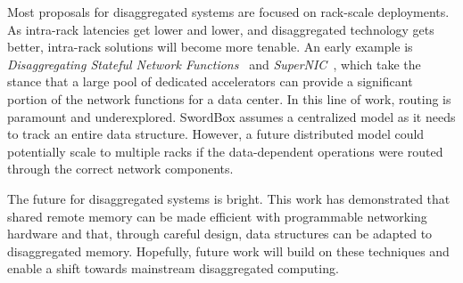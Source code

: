 \documentclass[12pt]{ucsddissertation}
\newcommand{\sword}{SwordBox}
\begin{document}
Most proposals for disaggregated systems are focused on rack-scale deployments. As intra-rack
latencies get lower and lower, and disaggregated technology gets better, intra-rack solutions will
become more tenable. An early example is \textit{Disaggregating Stateful Network
Functions}~\cite{dsnf} and \textit{SuperNIC}~\cite{supernic}, which take the stance that a large
pool of dedicated accelerators can provide a significant portion of the network functions for a data
center. In this line of work, routing is paramount and underexplored. {\sword} assumes a
centralized model as it needs to track an entire data structure. However, a future distributed model
could potentially scale to multiple racks if the data-dependent operations were routed through the
correct network components.

The future for disaggregated systems is bright. This work has demonstrated that shared remote memory
can be made efficient with programmable networking hardware and that, through careful design, data
structures can be adapted to disaggregated memory. Hopefully, future work will build on these
techniques and enable a shift towards mainstream disaggregated computing.







\end{document}
